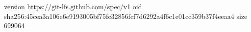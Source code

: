 version https://git-lfs.github.com/spec/v1
oid sha256:45cea3a106e6e9193005bf75fc32856fcf7d6292a4f6c1e01cc359b37f4eeaa4
size 699064
